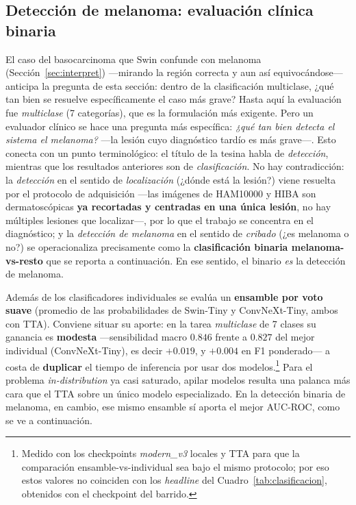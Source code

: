 \documentclass[11pt, a4paper]{article}
\begin{document}
\subsection{Detección de melanoma: evaluación clínica binaria}
\label{sec:melanoma}
El caso del basocarcinoma que Swin confunde con melanoma (Sección~\ref{sec:interpret}) —mirando la región
correcta y aun así equivocándose— anticipa la pregunta de esta sección: dentro de la clasificación
multiclase, ¿qué tan bien se resuelve específicamente el caso más grave? Hasta aquí la evaluación fue
\emph{multiclase} (7 categorías), que es la formulación más exigente. Pero
un evaluador clínico se hace una pregunta más específica: \emph{¿qué tan bien detecta el sistema el
melanoma?} —la lesión cuyo diagnóstico tardío es más grave—. Esto conecta con un punto terminológico:
el título de la tesina habla de \emph{detección}, mientras que los resultados anteriores son de
\emph{clasificación}. No hay contradicción: la \emph{detección} en el sentido de \emph{localización}
(¿dónde está la lesión?) viene resuelta por el protocolo de adquisición —las imágenes de HAM10000 y HIBA
son dermatoscópicas \textbf{ya recortadas y centradas en una única lesión}, no hay múltiples lesiones que
localizar—, por lo que el trabajo se concentra en el diagnóstico; y la \emph{detección de melanoma} en el
sentido de \emph{cribado} (¿es melanoma o no?) se operacionaliza precisamente como la \textbf{clasificación
binaria melanoma-vs-resto} que se reporta a continuación. En ese sentido, el binario \emph{es} la detección
de melanoma.

Además de los clasificadores individuales se evalúa un \textbf{ensamble por voto suave} (promedio de las
probabilidades de Swin-Tiny y ConvNeXt-Tiny, ambos con TTA). Conviene situar su aporte: en la tarea
\emph{multiclase} de 7 clases su ganancia es \textbf{modesta} —sensibilidad macro $0.846$ frente a $0.827$
del mejor individual (ConvNeXt-Tiny), es decir $+0.019$, y $+0.004$ en F1 ponderado— a costa de
\textbf{duplicar} el tiempo de inferencia por usar dos modelos.\footnote{Medido con los checkpoints
\emph{modern\_v3} locales y TTA para que la comparación ensamble-vs-individual sea bajo el mismo protocolo;
por eso estos valores no coinciden con los \emph{headline} del Cuadro~\ref{tab:clasificacion}, obtenidos
con el checkpoint del barrido.} Para el problema \emph{in-distribution} ya casi saturado, apilar modelos
resulta una palanca más cara que el TTA sobre un único modelo especializado. En la detección binaria de
melanoma, en cambio, ese mismo ensamble sí aporta el mejor AUC-ROC, como se ve a continuación.
\end{document}
